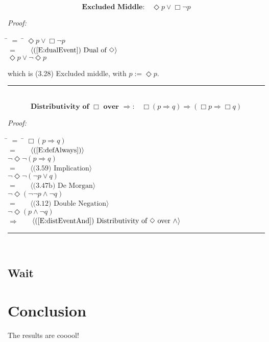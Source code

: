 \documentclass[fleqn, leqno]{article}
\newcommand{\lgap}{2pt}                             %
\newcommand{\mymathindent}{24pt}                      %
\newcommand{\Event}{\Diamond}
\newcommand{\Always}{\Box}
\newcommand{\myqed}{\hfill\rule[-.23ex]{1.2ex}{2.0ex}}
\newcommand{\Gll} {\langle}                         %
\newcommand{\Ggg} {\rangle}                         %
\newcommand{\Hint}[1]     {\ \ \ $\Gll              \mbox{#1} \Ggg$ }   %
\begin{document}
\begin{equation}\label{E:excludedMid}
\textbf{Excluded Middle:}\quad \Event p \lor \Always\lnot p
\end{equation}

\emph{Proof:}
\begin{tabbing}
\hspace{\mymathindent} \= $= \;$ \= \kill
  \> \>   $\Event p \lor \Always\lnot p$\\[\lgap]
  \> $=$  \>  \Hint{(\ref{E:dualEvent}) Dual of $\Event$}\\[\lgap]
  \> \>   $\Event p \lor \lnot\Event p$\\[\lgap]
\end{tabbing}
which is (3.28) Excluded middle, with $p := \Event p$. \myqed\\[\lgap]


\begin{equation}\label{E:distAlwaysImp}
\textbf{Distributivity of $\Always$ over $\Rightarrow$:}\quad \Always (p \Rightarrow q) \Rightarrow (\Always p \Rightarrow \Always q)
\end{equation}

\emph{Proof:}
\begin{tabbing}
\hspace{\mymathindent} \= $= \;$ \= \kill
  \> \>   $\Always(p \Rightarrow q)$\\[\lgap]
  \> $=$  \>  \Hint{(\ref{E:defAlways})}\\[\lgap]
  \> \>   $\lnot\Event\lnot(p \Rightarrow q)$\\[\lgap]
  \> $=$  \>  \Hint{(3.59) Implication}\\[\lgap]
  \> \>   $\lnot\Event\lnot(\lnot p \lor q)$\\[\lgap]
  \> $=$  \>  \Hint{(3.47b) De Morgan}\\[\lgap]
  \> \>   $\lnot\Event(\lnot\lnot p \land \lnot q)$\\[\lgap]
  \> $=$  \>  \Hint{(3.12) Double Negation}\\[\lgap]
  \> \>   $\lnot\Event(p \land \lnot q)$\\[\lgap]
  \> $\Rightarrow$  \>  \Hint{(\ref{E:distEventAnd}) Distributivity of $\Event$ over $\land$}\\[\lgap]
\end{tabbing}
\myqed\\[\lgap]


\subsection{Wait}

\section{Conclusion}

The results are cooool!\\



\end{document}
